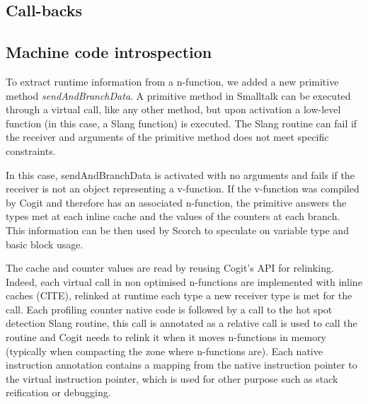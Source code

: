 \documentclass[a4paper,12pt,twoside]{../includes/ThesisStyle}
\begin{document}
\subsection{Call-backs}





\subsection{Machine code introspection}

To extract runtime information from a n-function, we added a new primitive method \emph{sendAndBranchData}. A primitive method in Smalltalk can be executed through a virtual call, like any other method, but upon activation a low-level function (in this case, a Slang function) is executed. The Slang routine can fail if the receiver and arguments of the primitive method does not meet specific constraints. 

In this case, sendAndBranchData is activated with no arguments and fails if the receiver is not an object representing a v-function. If the v-function was compiled by Cogit and therefore has an associated n-function, the primitive answers the types met at each inline cache and the values of the counters at each branch. This information can be then used by Scorch to speculate on variable type and basic block usage. 

The cache and counter values are read by reusing Cogit's API for relinking. Indeed, each virtual call in non optimised n-functions are implemented with inline caches (CITE), relinked at runtime each type a new receiver type is met for the call. Each profiling counter native code is followed by a call to the hot spot detection Slang routine, this call is annotated as a relative call is used to call the routine and Cogit needs to relink it when it moves n-functions in memory (typically when compacting the zone where n-functions are). Each native instruction annotation contains a mapping from the native instruction pointer to the virtual instruction pointer, which is used for other purpose such as stack reification or debugging.
\end{document}

